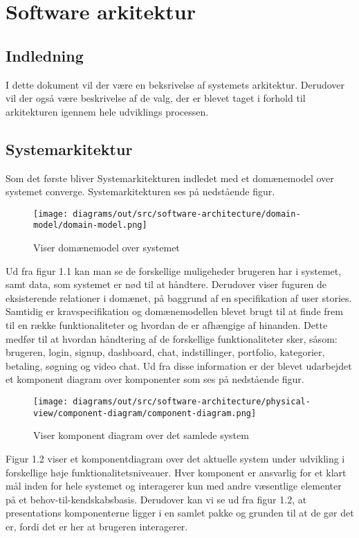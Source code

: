 \chapter{Software arkitektur}

\section{Indledning}

I dette dokument vil der være en beksrivelse af systemets arkitektur. 
Derudover vil der også være beskrivelse af de valg, der er blevet taget i forhold til arkitekturen igennem hele udviklings processen. 

\section{Systemarkitektur}
Som det første bliver Systemarkitekturen indledet med et domænemodel over systemet converge. Systemarkitekturen ses på nedstående figur.

\begin{figure}[ht]
    \centering
\texttt{[image: diagrams/out/src/software-architecture/domain-model/domain-model.png]}
\caption{Viser domænemodel over systemet}
\label{fig:figure2}
\end{figure}

Ud fra figur 1.1 kan man se de forskellige muligeheder brugeren har i systemet, samt data, som systemet er nød til at håndtere. Derudover viser fuguren  de eksisterende relationer i domænet, på baggrund af en specifikation af user stories. 
Samtidig er kravspecifikation og domænemodellen blevet brugt til at finde frem til en række funktionaliteter og hvordan de er afhængige af hinanden. Dette medfør til at hvordan håndtering af de forskellige funktionaliteter sker, såsom: brugeren, login, signup, dashboard, chat, indstillinger, portfolio, kategorier, betaling, søgning og video chat. Ud fra disse information er der blevet udarbejdet et komponent diagram over komponenter som ses på nedstående figur.
\newpage
\begin{figure}[ht]
    \centering
\texttt{[image: diagrams/out/src/software-architecture/physical-view/component-diagram/component-diagram.png]}
\caption{Viser komponent diagram over det samlede system}
\label{fig:figure2}
\end{figure}

Figur 1.2 viser et komponentdiagram over det aktuelle system under udvikling i forskellige høje funktionalitetsniveauer. Hver komponent er ansvarlig for et klart mål inden for hele systemet og interagerer kun med andre væsentlige elementer på et behov-til-kendskabsbasis. Derudover kan vi se ud fra figur 1.2, at presentations komponenterne ligger i en samlet pakke og grunden til at de gør det er, fordi det er her at brugeren interagerer.

